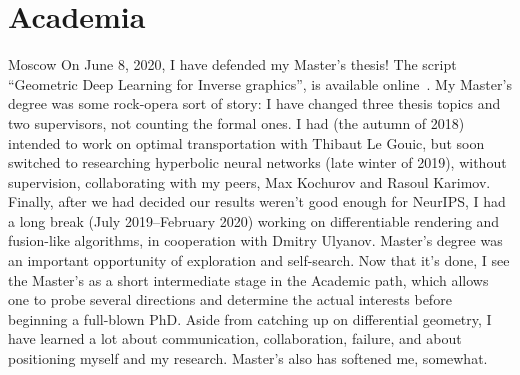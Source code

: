 \documentclass[10pt,a4paper]{moderncv}
\begin{document}
\section{Academia}
%
{Moscow}{}{
    On June 8, 2020, I have defended my Master's thesis!
    The script ``Geometric Deep Learning for Inverse graphics'', is available
    online~\citep{msThesis}.
    My Master's degree was some rock-opera sort of story:
    I have changed three thesis topics and two supervisors, not counting the
    formal ones. I had (the autumn of 2018) intended to work on optimal
    transportation with Thibaut Le Gouic, but soon switched to researching
    hyperbolic neural networks (late winter of 2019),
    without supervision, collaborating with my peers, Max Kochurov and Rasoul Karimov.
    Finally, after we had decided our results weren't good enough for NeurIPS,
    I had a long break (July 2019--February 2020) working on differentiable
    rendering and fusion-like algorithms, in cooperation with Dmitry
    Ulyanov. Master's degree was an important opportunity of exploration and
    self-search. Now that it's done, I see the Master's as a short intermediate
    stage in the Academic path, which allows one to probe several directions
    and determine the actual interests before beginning a full-blown PhD.
    Aside from catching up on differential geometry, I have learned a lot about
    communication, collaboration, failure, and about positioning myself and my
    research. Master's also has softened me, somewhat.
}
\end{document}
